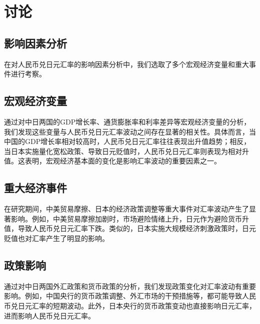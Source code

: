 
\chapter{讨论}
\section{影响因素分析}
在对人民币兑日元汇率的影响因素分析中，我们选取了多个宏观经济变量和重大事件进行考察。
\section{宏观经济变量}
通过对中日两国的GDP增长率、通货膨胀率和利率差异等宏观经济变量的分析，我们发现这些变量与人民币兑日元汇率波动之间存在显著的相关性。具体而言，当中国的GDP增长率相对较高时，人民币兑日元汇率往往表现出升值趋势；相反，当日本实施量化宽松政策、导致日元贬值时，人民币兑日元汇率则表现为相对升值。这表明，宏观经济基本面的变化是影响汇率波动的重要因素之一。
\section{重大经济事件}
在研究期间，中美贸易摩擦、日本的经济政策调整等重大事件对汇率波动产生了显著影响。例如，中美贸易摩擦加剧时，市场避险情绪上升，日元作为避险货币升值，导致人民币兑日元汇率下跌。类似的，日本实施大规模经济刺激政策时，日元贬值也对汇率产生了明显的影响。
\section{政策影响}
通过对中日两国外汇政策和货币政策的分析，我们发现政策变化对汇率波动有重要影响。例如，中国央行的货币政策调整、外汇市场的干预措施等，都可能导致人民币兑日元汇率的短期波动。此外，日本央行的货币政策变动也直接影响日元汇率，进而影响人民币兑日元汇率。
